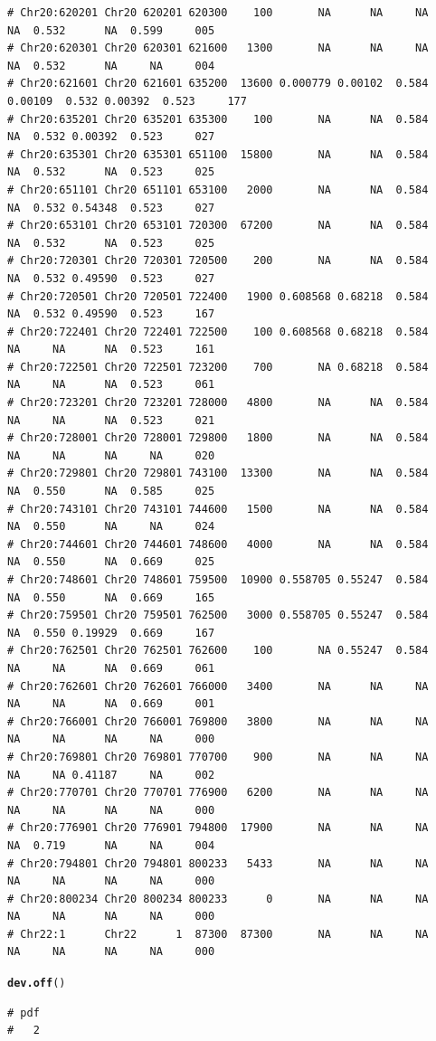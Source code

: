 \documentclass{article}\usepackage[]{graphicx}\usepackage[]{color}
\makeatletter
\newcommand{\hlstd}[1]{\textcolor[rgb]{0.345,0.345,0.345}{#1}}%
\newcommand{\hlkwd}[1]{\textcolor[rgb]{0.737,0.353,0.396}{\textbf{#1}}}%
\newenvironment{kframe}{%
 \def\at@end@of@kframe{}%
 \ifinner\ifhmode%
  \def\at@end@of@kframe{\end{minipage}}%
  \begin{minipage}{\columnwidth}%
 \fi\fi%
 \def\FrameCommand##1{\hskip\@totalleftmargin \hskip-\fboxsep
 \colorbox{shadecolor}{##1}\hskip-\fboxsep
     \hskip-\linewidth \hskip-\@totalleftmargin \hskip\columnwidth}%
 \MakeFramed {\advance\hsize-\width
   \@totalleftmargin\z@ \linewidth\hsize
   \@setminipage}}%
 {\par\unskip\endMakeFramed%
 \at@end@of@kframe}
\newenvironment{knitrout}{}{} %
\makeatother
\begin{document}
\begin{knitrout}
\begin{kframe}
\begin{verbatim}
# Chr20:620201 Chr20 620201 620300    100       NA      NA     NA      NA  0.532      NA  0.599     005
# Chr20:620301 Chr20 620301 621600   1300       NA      NA     NA      NA  0.532      NA     NA     004
# Chr20:621601 Chr20 621601 635200  13600 0.000779 0.00102  0.584 0.00109  0.532 0.00392  0.523     177
# Chr20:635201 Chr20 635201 635300    100       NA      NA  0.584      NA  0.532 0.00392  0.523     027
# Chr20:635301 Chr20 635301 651100  15800       NA      NA  0.584      NA  0.532      NA  0.523     025
# Chr20:651101 Chr20 651101 653100   2000       NA      NA  0.584      NA  0.532 0.54348  0.523     027
# Chr20:653101 Chr20 653101 720300  67200       NA      NA  0.584      NA  0.532      NA  0.523     025
# Chr20:720301 Chr20 720301 720500    200       NA      NA  0.584      NA  0.532 0.49590  0.523     027
# Chr20:720501 Chr20 720501 722400   1900 0.608568 0.68218  0.584      NA  0.532 0.49590  0.523     167
# Chr20:722401 Chr20 722401 722500    100 0.608568 0.68218  0.584      NA     NA      NA  0.523     161
# Chr20:722501 Chr20 722501 723200    700       NA 0.68218  0.584      NA     NA      NA  0.523     061
# Chr20:723201 Chr20 723201 728000   4800       NA      NA  0.584      NA     NA      NA  0.523     021
# Chr20:728001 Chr20 728001 729800   1800       NA      NA  0.584      NA     NA      NA     NA     020
# Chr20:729801 Chr20 729801 743100  13300       NA      NA  0.584      NA  0.550      NA  0.585     025
# Chr20:743101 Chr20 743101 744600   1500       NA      NA  0.584      NA  0.550      NA     NA     024
# Chr20:744601 Chr20 744601 748600   4000       NA      NA  0.584      NA  0.550      NA  0.669     025
# Chr20:748601 Chr20 748601 759500  10900 0.558705 0.55247  0.584      NA  0.550      NA  0.669     165
# Chr20:759501 Chr20 759501 762500   3000 0.558705 0.55247  0.584      NA  0.550 0.19929  0.669     167
# Chr20:762501 Chr20 762501 762600    100       NA 0.55247  0.584      NA     NA      NA  0.669     061
# Chr20:762601 Chr20 762601 766000   3400       NA      NA     NA      NA     NA      NA  0.669     001
# Chr20:766001 Chr20 766001 769800   3800       NA      NA     NA      NA     NA      NA     NA     000
# Chr20:769801 Chr20 769801 770700    900       NA      NA     NA      NA     NA 0.41187     NA     002
# Chr20:770701 Chr20 770701 776900   6200       NA      NA     NA      NA     NA      NA     NA     000
# Chr20:776901 Chr20 776901 794800  17900       NA      NA     NA      NA  0.719      NA     NA     004
# Chr20:794801 Chr20 794801 800233   5433       NA      NA     NA      NA     NA      NA     NA     000
# Chr20:800234 Chr20 800234 800233      0       NA      NA     NA      NA     NA      NA     NA     000
# Chr22:1      Chr22      1  87300  87300       NA      NA     NA      NA     NA      NA     NA     000
\end{verbatim}
\begin{alltt}
\hlkwd{dev.off}\hlstd{()}
\end{alltt}
\begin{verbatim}
# pdf 
#   2
\end{verbatim}
\end{kframe}
\end{knitrout}
\end{document}
